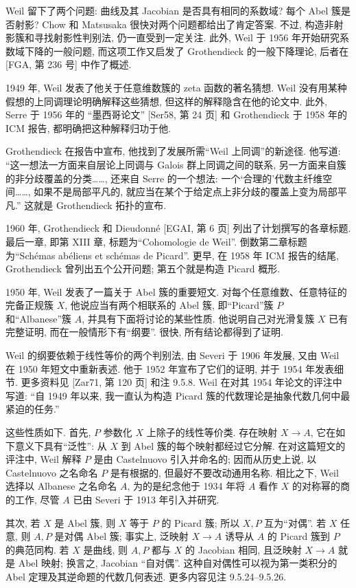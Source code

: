 Weil 留下了两个问题: 曲线及其 Jacobian 是否具有相同的系数域? 每个 Abel 簇是否射影? Chow 和 Matsusaka 很快对两个问题都给出了肯定答案. 不过, 构造非射影簇和寻找射影性判别法, 仍一直受到一定关注. 此外, Weil 于 1956 年开始研究系数域下降的一般问题, 而这项工作又启发了 Grothendieck 的一般下降理论, 后者在 [FGA, 第 236 号] 中作了概述.

1949 年, Weil 发表了他关于任意维数簇的 zeta 函数的著名猜想. Weil 没有用某种假想的上同调理论明确解释这些猜想, 但这样的解释隐含在他的论文中. 此外, Serre 于 1956 年的
“墨西哥论文” [Ser58, 第 24 页] 和 Grothendieck 于 1958 年的 ICM 报告, 都明确把这种解释归功于他.

Grothendieck 在报告中宣布, 他找到了发展所需“Weil 上同调”的新途径. 他写道: “这一想法一方面来自层论上同调与 Galois 群上同调之间的联系, 另一方面来自簇的非分歧覆盖的分类……, 还来自 Serre 的一个想法: 一个‘合理的’代数主纤维空间……, 如果不是局部平凡的, 就应当在某个于给定点上非分歧的覆盖上变为局部平凡.” 这就是 Grothendieck 拓扑的宣布.

1960 年, Grothendieck 和 Dieudonné [EGAI, 第 6 页] 列出了计划撰写的各章标题. 最后一章, 即第 XIII 章, 标题为“Cohomologie de Weil”. 倒数第二章标题为“Schémas abéliens et schémas de Picard”. 更早, 在 1958 年 ICM 报告的结尾, Grothendieck 曾列出五个公开问题; 第五个就是构造 Picard 概形.

1950 年, Weil 发表了一篇关于 Abel 簇的重要短文. 对每个任意维数、任意特征的完备正规簇 $X$, 他说应当有两个相联系的 Abel 簇, 即“Picard”簇 $P$ 和“Albanese”簇 $A$, 并具有下面将讨论的某些性质. 他说明自己对光滑复簇 $X$ 已有完整证明, 而在一般情形下有“纲要”. 很快, 所有结论都得到了证明.

Weil 的纲要依赖于线性等价的两个判别法, 由 Severi 于 1906 年发展, 又由 Weil 在 1950 年短文中重新表述. 他于 1952 年宣布了它们的证明, 并于 1954 年发表细节. 更多资料见 [Zar71, 第 120 页] 和注 9.5.8. Weil 在对其 1954 年论文的评注中写道: “自 1949 年以来, 我一直认为构造 Picard 簇的代数理论是抽象代数几何中最紧迫的任务.”

这些性质如下. 首先, $P$ 参数化 $X$ 上除子的线性等价类. 存在映射 $X\to A$, 它在如下意义下具有“泛性”: 从 $X$ 到 Abel 簇的每个映射都经过它分解. 在对这篇短文的评注中, Weil 解释 $P$ 是由 Castelnuovo 引入并命名的; 因而从历史上说, 以 Castelnuovo 之名命名 $P$ 是有根据的, 但最好不要改动通用名称. 相比之下, Weil 选择以 Albanese 之名命名 $A$, 为的是纪念他于 1934 年将 $A$ 看作 $X$ 的对称幂的商的工作, 尽管 $A$ 已由 Severi 于 1913 年引入并研究.

其次, 若 $X$ 是 Abel 簇, 则 $X$ 等于 $P$ 的 Picard 簇; 所以 $X,P$ 互为“对偶”. 若 $X$ 任意, 则 $A,P$ 是对偶 Abel 簇; 事实上, 泛映射 $X\to A$ 诱导从 $A$ 的 Picard 簇到 $P$ 的典范同构. 若 $X$ 是曲线, 则 $A,P$ 都与 $X$ 的 Jacobian 相同, 且泛映射 $X\to A$ 就是 Abel 映射; 换言之, Jacobian “自对偶”. 这种自对偶性可以视为第一类积分的 Abel 定理及其逆命题的代数几何表述. 更多内容见注 9.5.24--9.5.26.

